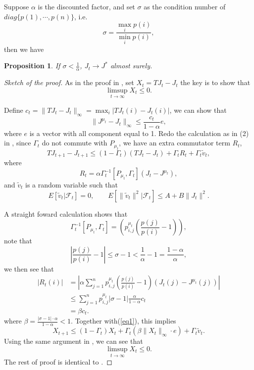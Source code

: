 \documentclass[12pt,a4paper]{amsart}
\numberwithin{equation}{section}
\theoremstyle{plain}
\newtheorem{Prop}[Th]{Proposition}
\theoremstyle{definition}
\begin{document}
Suppose $\alpha$ is the discounted factor, and set $\sigma $ as the condition number of $diag\{p(1), \cdots, p(n)\}$, i.e.
$$
\sigma = \frac{\max_{i} p(i)} {\min_{i} p(i)},
$$
then we have 
\begin{Prop}
	If $\sigma < \frac{1}{\alpha}$, $J_t \to J^*$ almost surely.
\end{Prop}

\begin{proof}[Sketch of the proof] 
	As in the proof in \cite{Ts03}, set $X_t = TJ_t - J_t$ the key is to show that 
	$$
	\limsup_{t \to \infty} X_t \le 0.
	$$
	
	Define $c_t = \|TJ_t - J_t\|_{\infty} = \max_{i} |TJ_t(i) - J_t(i)|$, we can show that 
	$$
	\|J^{\mu_t} - J_t\|_{\infty} \le \frac{c_t}{1-\alpha} e,
	$$
	where $e$ is a vector with all component equal to 1. Redo the calculation as in (2) in \cite{Ts03}, since $\Gamma_t$ do not commute with $P_{\mu_t}$, we have an extra commutator term $R_t $,
	\begin{equation} \label{eq1}
	TJ_{t+1} - J_{t+1} \leq (1-\Gamma_t) (TJ_t - J_t) + \Gamma_t R_t +  \Gamma_t \tilde{v}_t,
	\end{equation}
	where 
	$$
	R_t = \alpha \Gamma_t^{-1} [P_{\mu_t}, \Gamma_t] (J_t - J^{\mu_t}),
	$$
	and $\tilde{v}_t$ is a random variable such that 
	$$
	E[\tilde{v}_t | \mathcal{F}_t]  = 0, \qquad E[\|\tilde{v}_t\|^2 | \mathcal{F}_t] \le A + B\|J_t\|^2.
	$$
	
	A straight foward calculation shows that 
	$$
	\Gamma_t^{-1}[P_{\mu_t}, \Gamma_t]  = \left(p^{\mu_t}_{i,j} \left(\frac{p(j)}{p(i)} - 1\right)\right),
	$$
	note that 
	$$
	\left|\frac{p(j)}{p(i)} - 1 \right| \le  \sigma - 1  < \frac{1}{\alpha} - 1 = \frac{1-\alpha }{\alpha},
	$$
	we then see that
	$$
	\begin{aligned}
	|R_t(i)|& = \left| \alpha  \sum_{j= 1}^n p^{\mu_t}_{i,j} \left(\frac{p(j)}{p(i)} - 1\right) (J_t(j) - J^{\mu_t}(j)) \right| \\
	& \le  \sum_{j= 1}^n p^{\mu_t}_{i,j} |\sigma -1|  \frac{\alpha }{1-\alpha} c_t  \\
	& = \beta c_t.
	\end{aligned}
	$$
	where $\beta = \frac{|\sigma-1| \cdot \alpha}{1-\alpha} < 1$.  Together with(\ref{eq1}), this implies
	$$
	X_{t+1} \leq (1-\Gamma_t) X_t + \Gamma_t (\beta \|X_t\|_{\infty} \cdot e) +  \Gamma_t \tilde{v}_t.
	$$
	Using the same argument in \cite{Ts03}, we can see that
	$$
	\limsup_{t \to \infty} X_t \le 0.
	$$
	The rest of proof is identical to \cite{Ts03}.
\end{proof}
\end{document}
